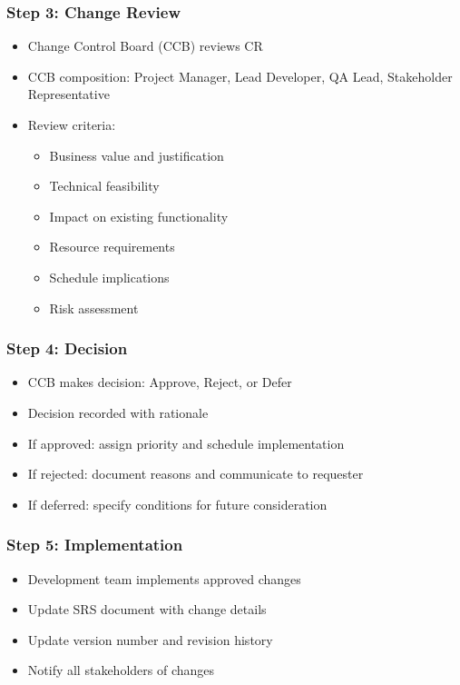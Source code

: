 \documentclass[12pt,a4paper]{article}
\begin{document}
\subsubsection{Step 3: Change Review}
\begin{itemize}
    \item Change Control Board (CCB) reviews CR
    \item CCB composition: Project Manager, Lead Developer, QA Lead, Stakeholder Representative
    \item Review criteria:
    \begin{itemize}
        \item Business value and justification
        \item Technical feasibility
        \item Impact on existing functionality
        \item Resource requirements
        \item Schedule implications
        \item Risk assessment
    \end{itemize}
\end{itemize}

\subsubsection{Step 4: Decision}
\begin{itemize}
    \item CCB makes decision: Approve, Reject, or Defer
    \item Decision recorded with rationale
    \item If approved: assign priority and schedule implementation
    \item If rejected: document reasons and communicate to requester
    \item If deferred: specify conditions for future consideration
\end{itemize}

\subsubsection{Step 5: Implementation}
\begin{itemize}
    \item Development team implements approved changes
    \item Update SRS document with change details
    \item Update version number and revision history
    \item Notify all stakeholders of changes
\end{itemize}
\end{document}
